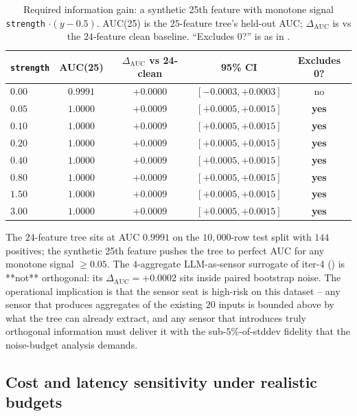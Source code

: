 \begin{table}[t]
\centering
\small
\caption{Required information gain: a synthetic 25th feature with
monotone signal \texttt{strength} $\cdot(y - 0.5)$. AUC(25) is the
$25$-feature tree's held-out AUC; $\Delta_{\text{AUC}}$ is vs the
$24$-feature clean baseline. ``Excludes 0?'' is as in
.}
\label{tab:p8-info-gain}
\begin{tabular}{lcccc}
\toprule
\texttt{strength} & AUC(25) & $\Delta_{\text{AUC}}$ vs 24-clean & 95\% CI & Excludes 0? \\
\midrule
$0.00$ & $0.9991$ & $+0.0000$ & $[-0.0003, +0.0003]$ & no \\
$0.05$ & $1.0000$ & $+0.0009$ & $[+0.0005, +0.0015]$ & \textbf{yes} \\
$0.10$ & $1.0000$ & $+0.0009$ & $[+0.0005, +0.0015]$ & \textbf{yes} \\
$0.20$ & $1.0000$ & $+0.0009$ & $[+0.0005, +0.0015]$ & \textbf{yes} \\
$0.40$ & $1.0000$ & $+0.0009$ & $[+0.0005, +0.0015]$ & \textbf{yes} \\
$0.80$ & $1.0000$ & $+0.0009$ & $[+0.0005, +0.0015]$ & \textbf{yes} \\
$1.50$ & $1.0000$ & $+0.0009$ & $[+0.0005, +0.0015]$ & \textbf{yes} \\
$3.00$ & $1.0000$ & $+0.0009$ & $[+0.0005, +0.0015]$ & \textbf{yes} \\
\bottomrule
\end{tabular}
\end{table}

The $24$-feature tree sits at AUC $0.9991$ on the $10{,}000$-row
test split with $144$ positives; the synthetic 25th feature pushes
the tree to perfect AUC for any monotone signal $\ge 0.05$. The
$4$-aggregate LLM-as-sensor surrogate of iter-4
() is **not** orthogonal: its $\Delta
_{\text{AUC}} = +0.0002$ sits inside paired bootstrap noise. The
operational implication is that the sensor seat is high-risk on this
dataset -- any sensor that produces aggregates of the existing
$20$ inputs is bounded above by what the tree can already extract,
and any sensor that introduces truly orthogonal information must
deliver it with the sub-$5\%$-of-stddev fidelity that the
noise-budget analysis demands.

\subsection{Cost and latency sensitivity under realistic budgets}

